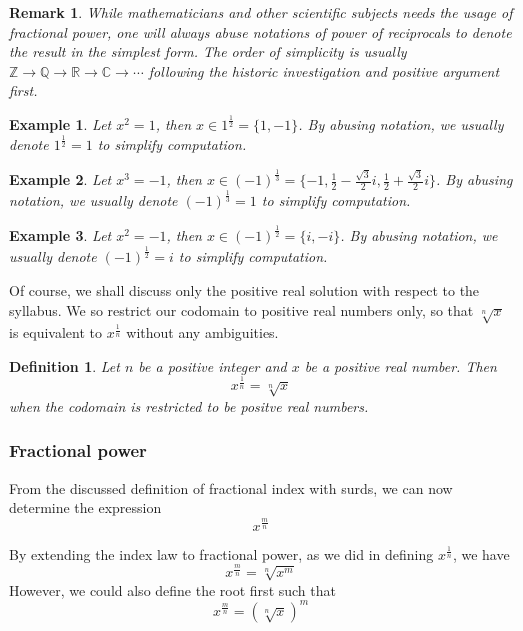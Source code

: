 \documentclass[12pt]{article}
\newtheorem{definition}{Definition}[section]
\newtheorem*{remark}{Remark}
\newtheorem*{example}{Example}
\begin{document}
    \begin{remark}
        While mathematicians and other scientific subjects needs the usage of fractional power, one will always abuse notations of power of reciprocals to denote the result in the simplest form. The order of simplicity is usually $\mathbb{Z} \to \mathbb{Q} \to \mathbb{R} \to \mathbb{C} \to \cdots$ following the historic investigation and positive argument first.
    \end{remark}

    \begin{example}
        Let $x^2=1$, then $x\in 1^{\frac{1}{2}}=\{1,-1\}$. By abusing notation, we usually denote $1^{\frac{1}{2}}=1$ to simplify computation.
    \end{example}

    \begin{example}
        Let $x^3=-1$, then $x\in (-1)^{\frac{1}{3}}=\{-1,\frac{1}{2}-\frac{\sqrt{3}}{2}i,\frac{1}{2}+\frac{\sqrt{3}}{2}i\}$. By abusing notation, we usually denote $(-1)^{\frac{1}{3}}=1$ to simplify computation.
    \end{example}

    \begin{example}
        Let $x^2=-1$, then $x\in (-1)^{\frac{1}{2}}=\{i,-i\}$. By abusing notation, we usually denote $(-1)^{\frac{1}{2}}=i$ to simplify computation.
    \end{example}

    Of course, we shall discuss only the positive real solution with respect to the syllabus. We so restrict our codomain to positive real numbers only, so that $\sqrt[n]{x}$ is equivalent to $x^{\frac{1}{n}}$ without any ambiguities.

    \begin{definition}
        Let $n$ be a positive integer and $x$ be a positive real number. Then $$x^{\frac{1}{n}}=\sqrt[n]{x}$$ when the codomain is restricted to be positve real numbers.
    \end{definition}

    \subsubsection*{Fractional power}

    From the discussed definition of fractional index with surds, we can now determine the expression $$x^{\frac{m}{n}}$$

    By extending the index law to fractional power, as we did in defining $x^{\frac{1}{n}}$, we have $$x^{\frac{m}{n}}=\sqrt[n]{x^m}$$
    However, we could also define the root first such that $$x^{\frac{m}{n}}=(\sqrt[n]{x})^m$$
\end{document}
